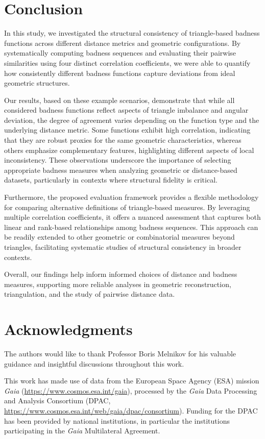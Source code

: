 \documentclass[11pt]{article}
\begin{document}
\section{Conclusion}
In this study, we investigated the structural consistency of triangle-based badness functions across different distance metrics and geometric configurations. By systematically computing badness sequences and evaluating their pairwise similarities using four distinct correlation coefficients, we were able to quantify how consistently different badness functions capture deviations from ideal geometric structures.

Our results, based on these example scenarios, demonstrate that while all considered badness functions reflect aspects of triangle imbalance and angular deviation, the degree of agreement varies depending on the function type and the underlying distance metric. Some functions exhibit high correlation, indicating that they are robust proxies for the same geometric characteristics, whereas others emphasize complementary features, highlighting different aspects of local inconsistency. These observations underscore the importance of selecting appropriate badness measures when analyzing geometric or distance-based datasets, particularly in contexts where structural fidelity is critical.

Furthermore, the proposed evaluation framework provides a flexible methodology for comparing alternative definitions of triangle-based measures. By leveraging multiple correlation coefficients, it offers a nuanced assessment that captures both linear and rank-based relationships among badness sequences. This approach can be readily extended to other geometric or combinatorial measures beyond triangles, facilitating systematic studies of structural consistency in broader contexts.

Overall, our findings help inform informed choices of distance and badness measures, supporting more reliable analyses in geometric reconstruction, triangulation, and the study of pairwise distance data.

\section*{Acknowledgments}
The authors would like to thank Professor Boris Melnikov for his valuable guidance and insightful discussions throughout this work.

This work has made use of data from the European Space Agency (ESA) mission
{\it Gaia} (\url{https://www.cosmos.esa.int/gaia}), processed by the {\it Gaia}
Data Processing and Analysis Consortium (DPAC,
\url{https://www.cosmos.esa.int/web/gaia/dpac/consortium}). Funding for the DPAC
has been provided by national institutions, in particular the institutions
participating in the {\it Gaia} Multilateral Agreement.
\end{document}
